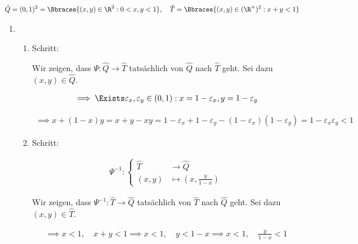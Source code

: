   \begin{solution}

  \begin{align*}
    \hat Q
    =
    (0, 1)^2
    =
    \Bbraces{(x, y) \in \R^2: 0 < x, y < 1},
    \quad
    \hat T
    =
    \Bbraces{(x, y) \in (\R^+)^2: x + y < 1}
  \end{align*}

  \begin{enumerate}[label = \textbf{\alph*)}]

    \item

    \begin{enumerate}[label = \arabic*.]

      \item Schritt:

      Wir zeigen, dass $\Psi: \hat Q \to \hat T$ tatsächlich von $\hat Q$ nach $\hat T$ geht.
      Sei dazu $(x, y) \in \hat Q$.

      \begin{align*}
        \implies
        \Exists \varepsilon_x, \varepsilon_y \in (0, 1):
        x = 1 - \varepsilon_x,
        y = 1 - \varepsilon_y
      \end{align*}

      \begin{align*}
        \implies
        x + (1 - x) y
        =
        x + y - xy
        =
        1 - \varepsilon_x + 1 - \varepsilon_y - (1 - \varepsilon_x)(1 - \varepsilon_y)
        =
        1 - \varepsilon_x \varepsilon_y
        <
        1
      \end{align*}

      \item Schritt:

      \begin{align*}
        \Psi^{-1}:
        \begin{cases}
          \hat T & \to \hat Q \\
          (x, y) & \mapsto (x, \frac{y}{1 - x})
        \end{cases}
      \end{align*}

      Wir zeigen, dass $\Psi^{-1}: \hat T \to \hat Q$ tatsächlich von $\hat T$ nach $\hat Q$ geht.
      Sei dazu $(x, y) \in \hat T$.

      \begin{align*}
        \implies
        x < 1, \quad x + y < 1
        \implies
        x < 1, \quad y < 1 - x
        \implies
        x < 1, \quad \frac{y}{1-x} < 1
      \end{align*}


\end{enumerate}
\end{enumerate}
\end{solution}
